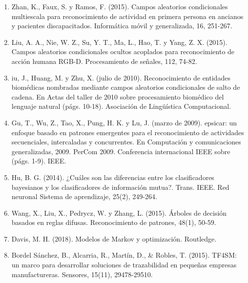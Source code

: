 \documentclass[10pt]{article}
\begin{document}
\begin{enumerate}
	\item	Zhan, K., Faux, S. y Ramos, F. (2015). Campos aleatorios condicionales multiescala para reconocimiento de actividad en primera persona en ancianos y pacientes discapacitados. Informática móvil y generalizada, 16, 251-267.
	\item	Liu, A. A., Nie, W. Z., Su, Y. T., Ma, L., Hao, T. y Yang, Z. X. (2015). Campos aleatorios condicionales ocultos acoplados para reconocimiento de acción humana RGB-D. Procesamiento de señales, 112, 74-82.
	\item	iu, J., Huang, M. y Zhu, X. (julio de 2010). Reconocimiento de entidades biomédicas nombradas mediante campos aleatorios condicionales de salto de cadena. En Actas del taller de 2010 sobre procesamiento biomédico del lenguaje natural (págs. 10-18). Asociación de Lingüística Computacional.
	\item	Gu, T., Wu, Z., Tao, X., Pung, H. K. y Lu, J. (marzo de 2009). epsicar: un enfoque basado en patrones emergentes para el reconocimiento de actividades secuenciales, intercaladas y concurrentes. En Computación y comunicaciones generalizadas, 2009. PerCom 2009. Conferencia internacional IEEE sobre (págs. 1-9). IEEE.
	\item	Hu, B. G. (2014). ¿Cuáles son las diferencias entre los clasificadores bayesianos y los clasificadores de información mutua?. Trans. IEEE. Red neuronal Sistema de aprendizaje, 25(2), 249-264.
	\item	Wang, X., Liu, X., Pedrycz, W. y Zhang, L. (2015). Árboles de decisión basados en reglas difusas. Reconocimiento de patrones, 48(1), 50-59.
	\item	Davis, M. H. (2018). Modelos de Markov y    optimización. Routledge.
	\item Bordel Sánchez, B., Alcarria, R., Martín,   D., & Robles, T. (2015). TF4SM: un marco            para desarrollar soluciones de trazabilidad         en pequeñas empresas manufactureras.                Sensores, 15(11), 29478-29510.
\end{enumerate}
\end{document}
